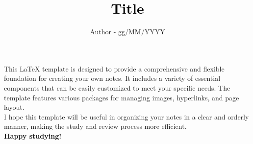 \documentclass[a4paper]{report}
\title{\huge \textbf{\textcolor{black}{Title}}}
\author{Author - gg/MM/YYYY}
\date{}
\begin{document}
\maketitle

\tableofcontents
\thispagestyle{empty}

This LaTeX template is designed to provide a comprehensive and flexible foundation for creating your own notes. It includes a variety of essential components that can be easily customized to meet your specific needs. The template features various packages for managing images, hyperlinks, and page layout.\\

\noindent
I hope this template will be useful in organizing your notes in a clear and orderly manner, making the study and review process more efficient. \\

\noindent
\colorbox{highlighter}{\textbf{Happy studying!}}









\nt{}
\end{document}
